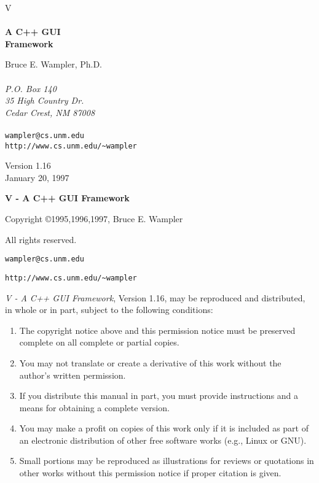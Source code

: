 \documentclass[letterpaper,draft]{book}
\begin{document}
\vspace*{1in} \thispagestyle{empty}
\begin{center}

\REALLYHUGE V \Huge \\ ~ \\ \textbf{A C++ GUI \\ Framework}

\vspace{1in}

\LARGE Bruce E. Wampler, Ph.D. \\
\large ~ \\
 \emph{P.O. Box 140} \\ 
 \emph{35 High Country Dr.} \\ 
 \emph{Cedar Crest, NM 87008} \\ ~ \\
 \texttt{wampler@cs.unm.edu} \\
 \texttt{http://www.cs.unm.edu/\~{}wampler}

\vspace{1in}
\normalsize
Version 1.16 \\
January 20, 1997
\end{center}

\newpage
\vspace*{1in} \thispagestyle{empty}

\textbf{V - A C++ GUI Framework}

Copyright \copyright 1995,1996,1997, Bruce E. Wampler

All rights reserved.

\texttt{wampler@cs.unm.edu}

\texttt{http://www.cs.unm.edu/\~{}wampler}

\vspace{1in}

\emph{V - A C++ GUI Framework}, Version 1.16,
may be reproduced and distributed, in whole or in part, subject
to the following conditions:

\begin{enumerate}
\item The copyright notice above and this permission notice must
be preserved complete on all complete or partial copies.

\item You may not translate or create a derivative of this work
without the author's written permission.

\item If you distribute this manual in part, you must provide
instructions and a means for obtaining a complete version.

\item You may make a profit on copies of this work only if it
is included as part of an electronic distribution of other free software
works (e.g., Linux or GNU).

\item Small portions may be reproduced as illustrations for reviews
or quotations in other works without this permission notice if proper
citation is given.

\end{enumerate}
\end{document}
